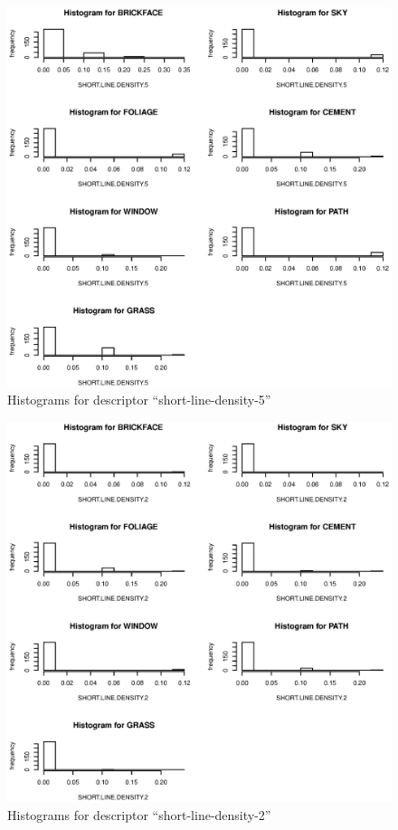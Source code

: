 \documentclass{article}
\begin{document}
\begin{figure}[htp]
\centering
\includegraphics[width=12cm]{a4.eps}
\caption{Histograms for descriptor ``short-line-density-5''}
\end{figure}

\begin{figure}[htp]
\centering
\includegraphics[width=12cm]{a5.eps}
\caption{Histograms for descriptor ``short-line-density-2''}
\end{figure}
\end{document}
